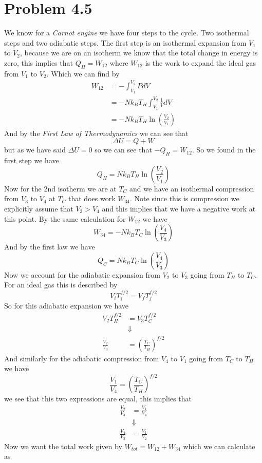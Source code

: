 \documentclass[11pt]{article}
\numberwithin{equation}{section}
\begin{document}


\section{Problem 4.5}
We know for a \emph{Carnot engine} we have four steps to the cycle. Two isothermal steps and two adiabatic steps. The first step is an isothermal expansion from $V_1$ to $V_2$, because we are on an isotherm we know that the total change in energy is zero, this implies that $Q_H = W_{12}$ where $W_{12}$ is the work to expand the ideal gas from $V_1$ to $V_2$. Which we can find by
\begin{align*}
W_{12} &= -\int_{V_1}^{V_2}PdV\\
&= -Nk_BT_H\int_{V_1}^{V_2}\frac{1}{V}dV\\
&= -Nk_BT_H\ln\left(\frac{V_2}{V_1}\right)
\end{align*}
And by the \emph{First Law of Thermodynamics} we can see that
$$\Delta U = Q + W$$
but as we have said $\Delta U = 0$ so we can see that $-Q_H = W_{12}$. So we found in the first step we have
$$Q_H = Nk_BT_H\ln\left(\frac{V_2}{V_1}\right)$$
Now for the 2nd isotherm we are at $T_C$ and we have an isothermal compression from $V_3$ to $V_4$ at $T_C$ that does work $W_{34}$. Note since this is compression we explicitly assume that $V_3>V_4$ and this implies that we have a negative work at this point. By the same calculation for $W_{12}$ we have
$$W_{34} = -Nk_BT_C\ln\left(\frac{V_4}{V_3}\right)$$
And by the first law we have
$$Q_C = Nk_BT_C\ln\left(\frac{V_4}{V_3}\right)$$
Now we account for the adiabatic expansion from $V_2$ to $V_3$ going from $T_H$ to $T_C$. For an ideal gas this is described by 
$$V_iT_i^{f/2} = V_fT_f^{f/2}$$
So for this adiabatic expansion we have
\begin{align*}
V_2T_H^{f/2} &= V_3T_C^{f/2}\\
&\Downarrow\\
\frac{V_2}{V_3} &= \left(\frac{T_C}{T_H}\right)^{f/2}
\end{align*}
And similarly for the adiabatic compression from $V_4$ to $V_1$ going from $T_C$ to $T_H$ we have
$$\frac{V_1}{V_4} = \left(\frac{T_C}{T_H}\right)^{f/2}$$
we see that this two expressions are equal, this implies that
\begin{align*}
\frac{V_2}{V_3} &= \frac{V_1}{V_4} \\
&\Downarrow\\
\frac{V_4}{V_3} &= \frac{V_1}{V_2} 
\end{align*}
Now we want the total work given by $W_{tot} = W_{12}+W_{34}$ which we can calculate as
\end{document}
